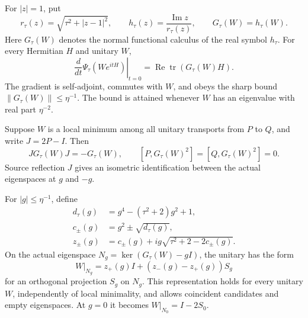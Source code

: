 \begin{proposition}
\label{prop:smoothed-local-spectral-structure}
For $|z|=1$, put
\[
 r_\tau(z)=\sqrt{\tau^2+|z-1|^2},\qquad
 h_\tau(z)=\frac{\operatorname{Im}z}{r_\tau(z)},\qquad
 G_\tau(W)=h_\tau(W).
\]
Here $G_\tau(W)$ denotes the normal functional calculus of the real
symbol $h_\tau$. For every Hermitian $H$ and unitary $W$,
\[
 \left.\frac{d}{dt}\Psi_\tau(We^{itH})\right|_{t=0}
       =\operatorname{Re}\operatorname{tr}(G_\tau(W)H).
\]
The gradient is self-adjoint, commutes with $W$, and obeys the sharp bound
$\|G_\tau(W)\|\leq\eta^{-1}$. The bound is attained whenever $W$ has
an eigenvalue with real part $\eta^{-2}$.

Suppose $W$ is a local minimum among all unitary transports from $P$ to
$Q$, and write $J=2P-I$. Then
\[
 JG_\tau(W)J=-G_\tau(W),\qquad
 [P,G_\tau(W)^2]=[Q,G_\tau(W)^2]=0.
\]
Source reflection $J$ gives an isometric identification between the
actual eigenspaces at $g$ and $-g$.

For $|g|\leq\eta^{-1}$, define
\[
 \begin{split}
 d_\tau(g)&=g^4-(\tau^2+2)g^2+1,\\
 c_\pm(g)&=g^2\pm\sqrt{d_\tau(g)},\\
 z_\pm(g)&=c_\pm(g)+ig\sqrt{\tau^2+2-2c_\pm(g)}.
 \end{split}
\]
On the actual eigenspace $N_g=\ker(G_\tau(W)-gI)$, the unitary has the form
\[
 W|_{N_g}=z_+(g)I+(z_-(g)-z_+(g))S_g
\]
for an orthogonal projection $S_g$ on $N_g$. This representation holds
for every unitary $W$, independently of local minimality, and allows
coincident candidates and empty eigenspaces. At $g=0$ it becomes
$W|_{N_0}=I-2S_0$.
\end{proposition}

